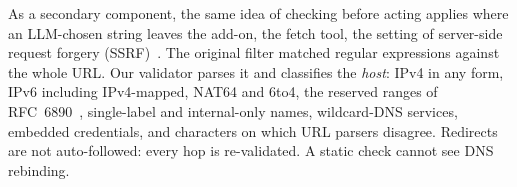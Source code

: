As a secondary component, the same idea of checking before acting applies where an LLM-chosen string leaves the add-on, the fetch tool, the setting of server-side request forgery (SSRF)~\cite{owaspssrf}. The original filter matched regular expressions against the whole URL. Our validator parses it and classifies the \emph{host}: IPv4 in any  form, IPv6 including IPv4-mapped, NAT64 and 6to4, the reserved ranges of RFC~6890~\cite{rfc6890}, single-label and internal-only names, wildcard-DNS services, embedded credentials, and characters on which URL parsers disagree. Redirects are not auto-followed: every hop is re-validated. A static check cannot see DNS rebinding.
